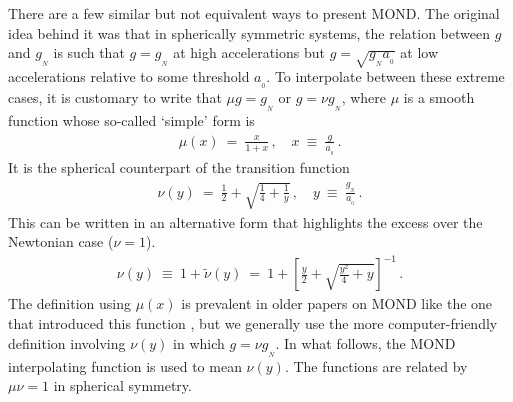 \documentclass[fleqn,usenatbib,useAMS,onecolumn]{mnras} %
\begin{document}
There are a few similar but not equivalent ways to present MOND. The original idea behind it was that in spherically symmetric systems, the relation between $g$ and $g_{_N}$ is such that $g = g_{_N}$ at high accelerations but $g = \sqrt{g_{_N} a_{_0}}$ at low accelerations relative to some threshold $a_{_0}$. To interpolate between these extreme cases, it is customary to write that $\mu g = g_{_N}$ or $g = \nu g_{_N}$, where $\mu$ is a smooth function whose so-called `simple' form is
\begin{eqnarray}
	\mu \left( x \right) ~=~ \frac{x}{1 + x} \, , \quad x ~\equiv~ \frac{g}{a_{_0}} \, .
	\label{Simple_mu_function}
\end{eqnarray}
It is the spherical counterpart of the transition function
\begin{eqnarray}
	\nu \left( y \right) ~=~ \frac{1}{2} + \sqrt{\frac{1}{4} + \frac{1}{y}} \, , \quad y ~\equiv~ \frac{g_{_N}}{a_{_0}} \, .
	\label{g_gN_simple}
\end{eqnarray}
This can be written in an alternative form that highlights the excess over the Newtonian case ($\nu = 1$).
\begin{eqnarray}
	\nu \left( y \right) ~\equiv~ 1 + \widetilde{\nu} \left( y \right) ~=~ 1 + \left[\frac{y}{2}+\sqrt{\frac{y^2}{4} + y} \right]^{-1} \, .
\end{eqnarray}
The definition using $\mu \left( x \right)$ is prevalent in older papers on MOND like the one that introduced this function \citep{Famaey_Binney_2005}, but we generally use the more computer-friendly definition involving $\nu \left( y \right)$ in which $g = \nu g_{_N}$. In what follows, the MOND interpolating function is used to mean $\nu \left( y \right)$. The functions are related by $\mu \nu = 1$ in spherical symmetry.
\end{document}
